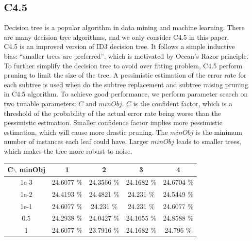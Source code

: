 \documentclass[a4paper,11pt]{article}
\begin{document}
\subsection{C4.5}
Decision tree is a popular algorithm in data mining and machine learning. There are many decision tree algorithms, and we only consider C4.5 in this paper.\\
C4.5 is an improved version of ID3 decision tree. It follows a simple inductive bias: ``smaller trees are preferred'', which is motivated by Occan's Razor principle. To further simplify the decision tree to avoid over fitting problem, C4.5 perform pruning to limit the size of the tree. A pessimistic estimation of the error rate for each subtree is used when do the subtree replacement and subtree raising pruning in C4.5 algorithm. To achieve good performance, we perform parameter search on two tunable parameters: $C$ and $minObj$. $C$ is the confident factor, which is a threshold of the probability of the actual error rate being worse than the pessimistic estimation\cite{morgan.kaufmann}. Smaller confidence factor implies more pessimistic estimation, which will cause more drastic pruning. The $minObj$ is the minimum number of instances each leaf could have. Larger $minObj$ leads to smaller trees, which makes the tree more robust to noise.
\vspace{0.5cm}\\
\begin{tabular}{c|c c c c}
C$\backslash$ minObj	&1		&2		&3		&4\\
\hline \hline
1e-3 	&24.6077 \%	&24.3566 \%	&24.1682 \%	 &24.6704 \%\\
1e-2	&24.4193 \%	 &24.4821 \%	&24.231  \%	 &24.5449 \%\\
1e-1	&24.6077 \%	&24.231  \%	&24.231  \%	 &24.6077 \%\\
0.5 &24.2938 \%     &24.0427 \% &24.1055 \%  &24.8588 \%\\
1	&24.6077 \%	    &23.7916 \%	&24.1682 \%	 &24.796  \%\\
\end{tabular}
\vspace{0.5cm}\\
\end{document}
